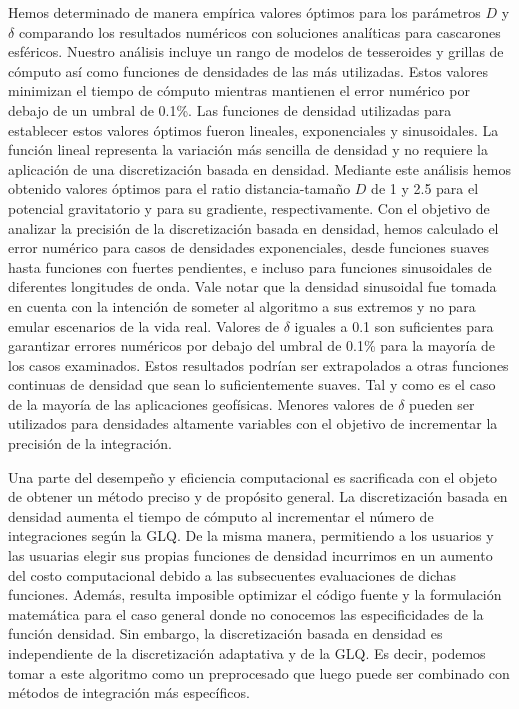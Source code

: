Hemos determinado de manera empírica valores óptimos para los parámetros $D$
y $\delta$ comparando los resultados numéricos con soluciones analíticas para
cascarones esféricos.
Nuestro análisis incluye un rango de modelos de tesseroides y grillas de
cómputo así como funciones de densidades de las más utilizadas.
Estos valores minimizan el tiempo de cómputo mientras mantienen el error
numérico por debajo de un umbral de 0.1\%.
Las funciones de densidad utilizadas para establecer estos valores óptimos
fueron lineales, exponenciales y sinusoidales.
La función lineal representa la variación más sencilla de densidad y no
requiere la aplicación de una discretización basada en densidad.
Mediante este análisis hemos obtenido valores óptimos para el ratio
distancia-tamaño $D$ de 1 y 2.5 para el potencial gravitatorio y para su
gradiente, respectivamente.
Con el objetivo de analizar la precisión de la discretización basada en
densidad, hemos calculado el error numérico para casos de densidades
exponenciales, desde funciones suaves hasta funciones con fuertes pendientes,
e incluso para funciones sinusoidales de diferentes longitudes de onda.
Vale notar que la densidad sinusoidal fue tomada en cuenta con la intención de
someter al algoritmo a sus extremos y no para emular escenarios de la vida
real.
Valores de $\delta$ iguales a 0.1 son suficientes para garantizar errores
numéricos por debajo del umbral de 0.1\% para la mayoría de los casos
examinados.
Estos resultados podrían ser extrapolados a otras funciones continuas de
densidad que sean lo suficientemente suaves. Tal y como es el caso de la
mayoría de las aplicaciones geofísicas.
Menores valores de $\delta$ pueden ser utilizados para densidades altamente
variables con el objetivo de incrementar la precisión de la integración.

Una parte del desempeño y eficiencia computacional es sacrificada con el objeto
de obtener un método preciso y de propósito general.
La discretización basada en densidad aumenta el tiempo de cómputo al
incrementar el número de integraciones según la \ac{GLQ}.
De la misma manera, permitiendo a los usuarios y las usuarias elegir sus
propias funciones de densidad incurrimos en un aumento del costo computacional
debido a las subsecuentes evaluaciones de dichas funciones.
Además, resulta imposible optimizar el código fuente y la formulación
matemática para el caso general donde no conocemos las especificidades de la
función densidad.
Sin embargo, la discretización basada en densidad es independiente de la
discretización adaptativa y de la \ac{GLQ}.
Es decir, podemos tomar a este algoritmo como un preprocesado que luego puede
ser combinado con métodos de integración más específicos.

